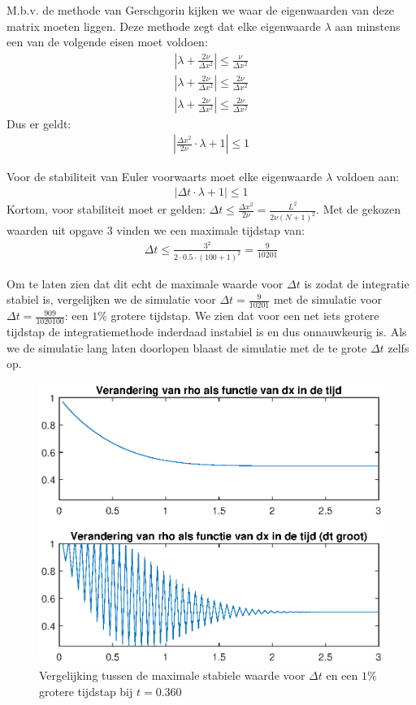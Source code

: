 \documentclass{article}
\newcommand{\Dt}{\Delta t}
\begin{document}
M.b.v. de methode van Gerschgorin kijken we waar de eigenwaarden van deze matrix moeten liggen.
Deze methode zegt dat elke eigenwaarde $\lambda$ aan minstens een van de volgende eisen moet voldoen:
\begin{align*}
\left|\lambda + \frac{2\nu}{\Delta x^2}\right| \leq \frac{\nu}{\Delta x^2}\\
\left|\lambda + \frac{2\nu}{\Delta x^2}\right| \leq \frac{2\nu}{\Delta x^2}\\
\left|\lambda + \frac{2\nu}{\Delta x^2}\right| \leq \frac{2\nu}{\Delta x^2}
\end{align*}
Dus er geldt:
\begin{align*}
\left|\frac{\Delta x^2}{2\nu} \cdot\lambda +1\right|\leq 1
\end{align*}

Voor de stabiliteit van Euler voorwaarts moet elke eigenwaarde $\lambda$ voldoen aan:
\begin{align*}
\left|\Delta t \cdot\lambda +1\right|\leq 1
\end{align*}
Kortom, voor stabiliteit moet er gelden: $\Delta t \leq \frac{\Delta x^2}{2\nu} =\frac{L^2}{2\nu(N+1)^2}$.
Met de gekozen waarden uit opgave $3$ vinden we een maximale tijdstap van:
\begin{align*}
\Delta t \leq \frac{3^2}{2\cdot 0.5 \cdot(100 +1)^2} = \frac{9}{10201}
\end{align*}

Om te laten zien dat dit echt de maximale waarde voor $\Dt$ is zodat de integratie stabiel is, vergelijken we de simulatie voor $\Dt = \frac{9}{10201}$ met de simulatie voor $\Dt = \frac{909}{1020100}$: een $1\%$ grotere tijdstap.
We zien dat voor een net iets grotere tijdstap de integratiemethode inderdaad instabiel is en dus onnauwkeurig is.
Als we de simulatie lang laten doorlopen blaast de simulatie met de te grote $\Dt$ zelfs op.
\vspace{-10pt}

\begin{figure}[H]
\centering
\includegraphics[scale=0.75]{5.eps}
\caption{Vergelijking tussen de maximale stabiele waarde voor $\Dt$ en een $1\%$ grotere tijdstap bij $t=0.360$}
\end{figure}
\end{document}
